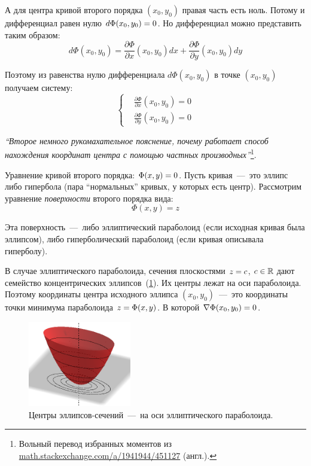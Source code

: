 \documentclass[a4paper,12pt]{article}
\begin{document}
  А для центра кривой второго порядка $(x_0, y_0)$ правая часть есть ноль.
  Потому и дифференциал равен нулю $d\Phi(x_0, y_0) \hm= 0$.
  Но дифференциал можно представить таким образом:
  \[
    d\Phi(x_0, y_0) = \frac{\partial \Phi}{\partial x}(x_0, y_0) dx + \frac{\partial \Phi}{\partial y}(x_0, y_0) dy
  \]
  
  Поэтому из равенства нулю дифференциала $d\Phi(x_0, y_0)$ в точке $(x_0, y_0)$ получаем систему:
  \[
    \left\{
      \begin{aligned}
        &\frac{\partial \Phi}{\partial x}(x_0, y_0) = 0\\
        &\frac{\partial \Phi}{\partial y}(x_0, y_0) = 0
      \end{aligned}
    \right.
  \]
  
  
  \medskip
  
  \emph{``Второе немного рукомахательное пояснение, почему работает способ нахождения координат центра с помощью частных производных''}\footnote{Вольный перевод избранных моментов из \href{https://math.stackexchange.com/a/1941944/451127}{math.stackexchange.com/a/1941944/451127} (англ.).}.
  
  Уравнение кривой второго порядка: $\Phi(x, y) \hm= 0$.
  Пусть кривая~---~это эллипс либо гипербола (пара ``нормальных'' кривых, у которых есть центр).
  Рассмотрим уравнение \emph{поверхности} второго порядка вида:
  \[
    \Phi(x, y) = z
  \]
  
  Эта поверхность~---~либо эллиптический параболоид (если исходная кривая была эллипсом), либо гиперболический параболоид (если кривая описывала гиперболу).
  
  В случае эллиптического параболоида, сечения плоскостями $z \hm= c$, $c \hm\in \RR$ дают семейство концентрических эллипсов~(\ref{fig:elliptic-paraboloid-for-center}).
  Их центры лежат на оси параболоида.
  Поэтому координаты центра исходного эллипса $(x_0, y_0)$~---~это координаты точки минимума параболоида $z \hm= \Phi(x, y)$.
  В которой $\nabla \Phi(x_0, y_0) \hm= 0$.
  
  \begin{figure}[h]
    \centering

    \includegraphics[width=0.4\textwidth]{elliptic-paraboloid-for-center.png}
  
    \caption{Центры эллипсов-сечений~---~на оси эллиптического параболоида.}
    \label{fig:elliptic-paraboloid-for-center}
  \end{figure}
  
\end{document}
